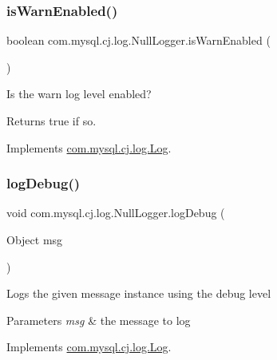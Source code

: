 \subsubsection{\texorpdfstring{is\+Warn\+Enabled()}{isWarnEnabled()}}
{\footnotesize\ttfamily boolean com.\+mysql.\+cj.\+log.\+Null\+Logger.\+is\+Warn\+Enabled (\begin{DoxyParamCaption}{ }\end{DoxyParamCaption})}

Is the \textquotesingle{}warn\textquotesingle{} log level enabled?

\begin{DoxyReturn}{Returns}
true if so. 
\end{DoxyReturn}


Implements \mbox{\hyperlink{interfacecom_1_1mysql_1_1cj_1_1log_1_1_log_a7877db04f22a78b801a8f2f8989d7043}{com.\+mysql.\+cj.\+log.\+Log}}.

\mbox{\label{classcom_1_1mysql_1_1cj_1_1log_1_1_null_logger_ae46ab625efa73570bb45757cacdf32f4}} 
\subsubsection{\texorpdfstring{log\+Debug()}{logDebug()}\hspace{0.1cm}{\footnotesize\ttfamily [1/2]}}
{\footnotesize\ttfamily void com.\+mysql.\+cj.\+log.\+Null\+Logger.\+log\+Debug (\begin{DoxyParamCaption}\item[{Object}]{msg }\end{DoxyParamCaption})}

Logs the given message instance using the \textquotesingle{}debug\textquotesingle{} level


\begin{DoxyParams}{Parameters}
{\em msg} & the message to log \\
\hline
\end{DoxyParams}


Implements \mbox{\hyperlink{interfacecom_1_1mysql_1_1cj_1_1log_1_1_log_a6149f715730ea0615ef6e341dd3e8a39}{com.\+mysql.\+cj.\+log.\+Log}}.

\mbox{\label{classcom_1_1mysql_1_1cj_1_1log_1_1_null_logger_aafdb325726af974c0ebfd5c134e934e4}} 
